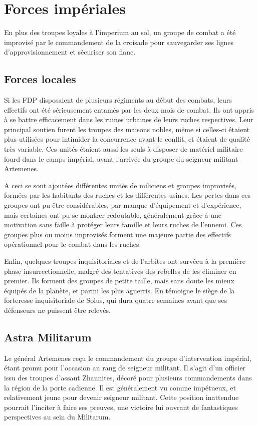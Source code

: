 \documentclass[10pt,a4paper]{book}
\begin{document}
\chapter{Forces impériales}
En plus des troupes loyales à l'imperium au sol, un groupe de combat a été improvisé par le commandement de la croisade pour sauvegarder ses lignes d'approvisionnement et sécuriser son flanc.
\section{Forces locales}
Si les FDP disposaient de plusieurs régiments au début des combats, leurs effectifs ont été sérieusement entamés par les deux mois de combat. Ils ont appris à se battre efficacement dans les ruines urbaines de leurs ruches respectives. Leur principal soutien furent les troupes des maisons nobles, même si celles-ci étaient plus utilisées pour intimider la concurrence avant le conflit, et étaient de qualité très variable. Ces unités étaient aussi les seuls à disposer de matériel militaire lourd dans le camps impérial, avant l'arrivée du groupe du seigneur militant Artemenes.

A ceci se sont ajoutées différentes unités de miliciens et groupes improvisés, formées par les habitants des ruches et les différentes usines. Les pertes dans ces groupes ont pu être considérables, par manque d'équipement et d'expérience, mais certaines ont pu se montrer redoutable, généralement grâce à une motivation sans faille à protéger leurs famille et leurs ruches de l'ennemi. Ces groupes plus ou moins improvisés forment une majeure partie des effectifs opérationnel pour le combat dans les ruches.

Enfin, quelques troupes inquisitoriales et de l'arbites ont survécu à la première phase insurrectionnelle, malgré des tentatives des rebelles de les éliminer en premier. Ils forment des groupes de petite taille, mais sans doute les mieux équipés de la planète, et parmi les plus aguerris. En témoigne le siège de la forteresse inquisitoriale de Solus, qui dura quatre semaines avant que ses défenseurs ne puissent être relevés.
\section{Astra Militarum}
Le général Artemenes reçu le commandement du groupe d'intervention impérial, étant promu pour l'occasion au rang de seigneur militant. Il s'agit d'un officier issu des troupes d'assaut Zhannites, décoré pour plusieurs commandements dans la région de la porte cadienne. Il est généralement vu comme impétueux, et relativement jeune pour devenir seigneur militant. Cette position inattendue pourrait l'inciter à faire ses preuves, une victoire lui ouvrant de fantastiques perspectives au sein du Militarum.
\end{document}
